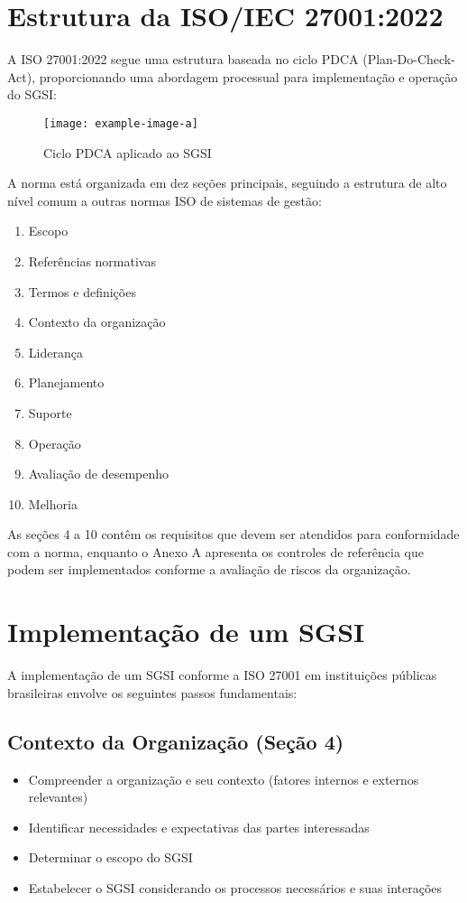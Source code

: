 \documentclass[12pt,a4paper]{report}
\begin{document}
\section{Estrutura da ISO/IEC 27001:2022}

A ISO 27001:2022 segue uma estrutura baseada no ciclo PDCA (Plan-Do-Check-Act), proporcionando uma abordagem processual para implementação e operação do SGSI:

\begin{figure}[h]
\centering
\texttt{[image: example-image-a]}
\caption{Ciclo PDCA aplicado ao SGSI}
\end{figure}

A norma está organizada em dez seções principais, seguindo a estrutura de alto nível comum a outras normas ISO de sistemas de gestão:

\begin{enumerate}
  \item Escopo
  \item Referências normativas
  \item Termos e definições
  \item Contexto da organização
  \item Liderança
  \item Planejamento
  \item Suporte
  \item Operação
  \item Avaliação de desempenho
  \item Melhoria
\end{enumerate}

As seções 4 a 10 contêm os requisitos que devem ser atendidos para conformidade com a norma, enquanto o Anexo A apresenta os controles de referência que podem ser implementados conforme a avaliação de riscos da organização.

\section{Implementação de um SGSI}

A implementação de um SGSI conforme a ISO 27001 em instituições públicas brasileiras envolve os seguintes passos fundamentais:

\subsection{Contexto da Organização (Seção 4)}

\begin{itemize}
  \item Compreender a organização e seu contexto (fatores internos e externos relevantes)
  \item Identificar necessidades e expectativas das partes interessadas
  \item Determinar o escopo do SGSI
  \item Estabelecer o SGSI considerando os processos necessários e suas interações
\end{itemize}
\end{document}
